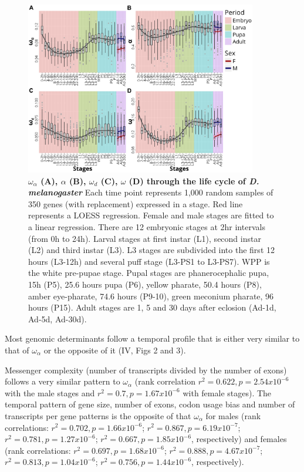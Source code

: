 \begin{figure}[t]
  \includegraphics[width=0.9\textwidth]{./Images/Art-IV/OmegaA_lifecycle.png}
  \centering
  \caption{\textbf{ {\large$\omega_{\alpha}$} (A),  {\large$\alpha$} (B), {\large$\omega_{d}$} (C), {\large$\omega$} (D) through the life cycle of \textit{D. melanogaster}} Each time point represents 1,000 random samples of 350 genes (with replacement) expressed in a stage. Red line represents a LOESS regression. Female and male stages are fitted to a linear regression. There are 12 embryonic stages at 2hr intervals (from 0h to 24h). Larval stages at first instar (L1), second instar (L2) and third instar (L3). L3 stages are subdivided into the first 12 hours (L3-12h) and several puff stage (L3-PS1 to L3-PS7). WPP is the white pre-pupae stage. Pupal stages are phanerocephalic pupa, 15h (P5), 25.6 hours pupa (P6), yellow pharate, 50.4 hours (P8), amber eye-pharate, 74.6 hours (P9-10), green meconium pharate, 96 hours (P15). Adult stages are 1, 5 and 30 days after eclosion (Ad-1d, Ad-5d, Ad-30d).
  }
  \label{fig:Art-IV-OmegaA_lifecycle}
\end{figure}


Most genomic determinants follow a temporal profile that is either very similar to that of $\omega_{\alpha}$ or the opposite of it (IV, Figs 2 and 3). 

Messenger complexity (number of transcripts divided by the number of exons) follows a very similar pattern to $\omega_{\alpha}$ (rank correlation $r^{2} = 0.622, p = 2.54x10^{-6}$ with the male stages and $r^{2} = 0.7, p =1.67x10^{-6}$ with female stages).
The temporal pattern of gene size, number of exons, codon usage bias and number of transcripts per gene patterns is the opposite of that $\omega_{\alpha}$  for males (rank correlations: $r^{2} = 0.702, p =1.66x10^{-6}$; $r^{2} = 0.867, p = 6.19x10^{-7}$; $r^{2} = 0.781, p = 1.27x10^{-6}$; $r^{2} = 0.667, p = 1.85x10^{-6}$, respectively) and females (rank correlations: $r^{2} = 0.697, p =1.68x10^{-6}$; $r^{2} = 0.888, p = 4.67x10^{-7}$; $r^{2} = 0.813, p =1.04x10^{-6}$; $r^{2} = 0.756, p =1.44x10^{-6}$, respectively). 

